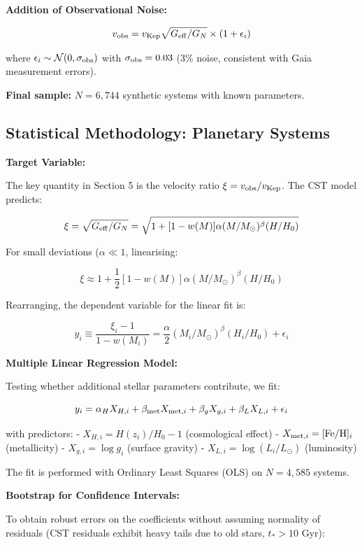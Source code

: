 \documentclass[11pt,a4paper]{article}
\begin{document}
\textbf{Addition of Observational Noise:}

\[v_{\rm obs} = v_{\rm Kep} \sqrt{G_{\rm eff}/G_N} \times (1 + \epsilon_i)\]

where \(\epsilon_i \sim \mathcal{N}(0, \sigma_{\rm obs})\) with
\(\sigma_{\rm obs} = 0.03\) (3\% noise, consistent with Gaia measurement
errors).

\textbf{Final sample:} \(N = 6,744\) synthetic systems with known
parameters.

\hypertarget{statistical-methodology-planetary-systems}{%
\subsection{Statistical Methodology: Planetary
Systems}\label{statistical-methodology-planetary-systems}}

\textbf{Target Variable:}

The key quantity in Section 5 is the velocity ratio
\(\xi = v_{\rm obs}/v_{\rm Kep}\). The CST model predicts:

\[\xi = \sqrt{G_{\rm eff}/G_N} = \sqrt{1 + [1-w(M)]\alpha(M/M_\odot)^\beta (H/H_0)}\]

For small deviations (\(\alpha \ll 1\), linearising:

\[\xi \approx 1 + \frac{1}{2}[1-w(M)]\alpha(M/M_\odot)^\beta (H/H_0)\]

Rearranging, the dependent variable for the linear fit is:

\[y_i \equiv \frac{\xi_i - 1}{1-w(M_i)} = \frac{\alpha}{2}(M_i/M_\odot)^\beta (H_i/H_0) + \epsilon_i\]

\textbf{Multiple Linear Regression Model:}

Testing whether additional stellar parameters contribute, we fit:

\[y_i = \alpha_H X_{H,i} + \beta_{\rm met} X_{{\rm met},i} + \beta_g X_{g,i} + \beta_L X_{L,i} + \epsilon_i\]

with predictors: - \(X_{H,i} = H(z_i)/H_0 - 1\) (cosmological effect) -
\(X_{{\rm met},i} = [{\rm Fe/H}]_i\) (metallicity) -
\(X_{g,i} = \log g_i\) (surface gravity) -
\(X_{L,i} = \log(L_i/L_\odot)\) (luminosity)

The fit is performed with Ordinary Least Squares (OLS) on \(N = 4,585\)
systems.

\textbf{Bootstrap for Confidence Intervals:}

To obtain robust errors on the coefficients without assuming normality
of residuals (CST residuals exhibit heavy tails due to old stars,
\(t_* > 10\) Gyr):
\end{document}
